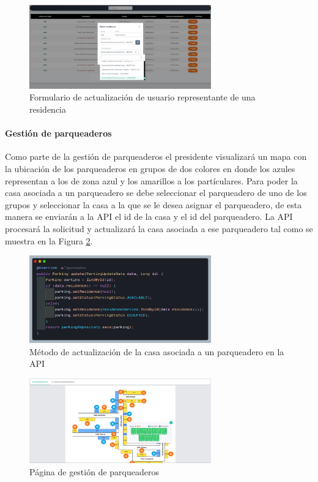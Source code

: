 \begin{figure}[H]
    \centering
    \includegraphics[width=0.7\textwidth]{resources/images/sw-residente-update}
    \caption{Formulario de actualización de usuario representante de una residencia}
    \label{fig:sw-residente-update}
\end{figure}

\paragraph{Gestión de parqueaderos}

Como parte de la gestión de parqueaderos el presidente visualizará un mapa con la ubicación de los parqueaderos en grupos de dos colores en donde los azules representan a los de zona azul y los amarillos a los partículares.
Para poder la casa asociada a un parqueadero se debe seleccionar el parqueadero de uno de los grupos y seleccionar la casa a la que se le desea asignar el parqueadero, de esta manera se enviarán a la API el id de la casa y el id del parqueadero.
La API procesará la solicitud y actualizará la casa asociada a ese parqueadero tal como se muestra en la Figura \ref{fig:api-parking-update}.

\begin{figure}[H]
    \centering
    \includegraphics[width=0.7\textwidth]{resources/images/api-parking-update-method}
    \caption{Método de actualización de la casa asociada a un parqueadero en la API}
    \label{fig:api-parking-update}
\end{figure}

\begin{figure}[H]
    \centering
    \includegraphics[width=0.7\textwidth]{resources/images/sw-parking-group}
    \caption{Página de gestión de parqueaderos}
    \label{fig:sw-parking-group}
\end{figure}

